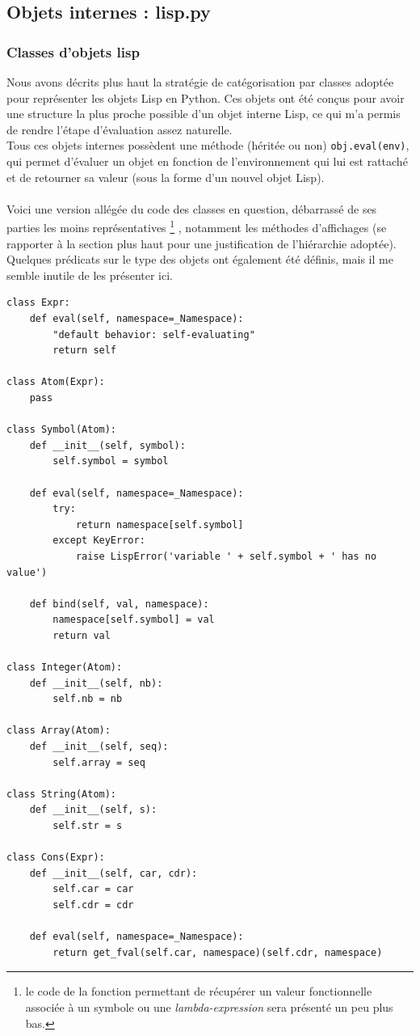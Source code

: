 \documentclass{article}
\begin{document}
\subsection{Objets internes : lisp.py}
\subsubsection{Classes d'objets lisp}
Nous avons décrits plus haut la stratégie de catégorisation par classes adoptée pour représenter 
les objets Lisp en Python.
Ces objets ont été conçus pour avoir une structure la plus proche possible d'un objet interne Lisp,
ce qui m'a permis de rendre l'étape d'évaluation assez naturelle.
\\
Tous ces objets internes possèdent une méthode (héritée ou non) \texttt{obj.eval(env)}, qui permet d'évaluer un objet 
en fonction de l'environnement qui lui est rattaché et de retourner sa valeur (sous la forme d'un nouvel objet Lisp).
\paragraph{}
Voici une version allégée du code des classes en question, débarrassé de ses parties les moins représentatives
    \footnote{le code de la fonction permettant de récupérer un valeur fonctionnelle associée
    à un symbole ou une \emph{lambda-expression} sera présenté un peu plus bas.}
, notamment les méthodes d'affichages (se rapporter à la section plus haut pour une justification de l'hiérarchie adoptée).
Quelques prédicats sur le type des objets ont également été définis, mais il me semble inutile de les présenter ici.

\begin{verbatim}
class Expr:
    def eval(self, namespace=_Namespace):
        "default behavior: self-evaluating"
        return self

class Atom(Expr):
    pass

class Symbol(Atom):
    def __init__(self, symbol):
        self.symbol = symbol

    def eval(self, namespace=_Namespace):
        try:
            return namespace[self.symbol]
        except KeyError:
            raise LispError('variable ' + self.symbol + ' has no value')

    def bind(self, val, namespace):
        namespace[self.symbol] = val
        return val
 
class Integer(Atom):
    def __init__(self, nb):
        self.nb = nb

class Array(Atom):
    def __init__(self, seq):
        self.array = seq

class String(Atom):
    def __init__(self, s):
        self.str = s

class Cons(Expr):
    def __init__(self, car, cdr):
        self.car = car
        self.cdr = cdr

    def eval(self, namespace=_Namespace):
        return get_fval(self.car, namespace)(self.cdr, namespace)
\end{verbatim}
\end{document}
